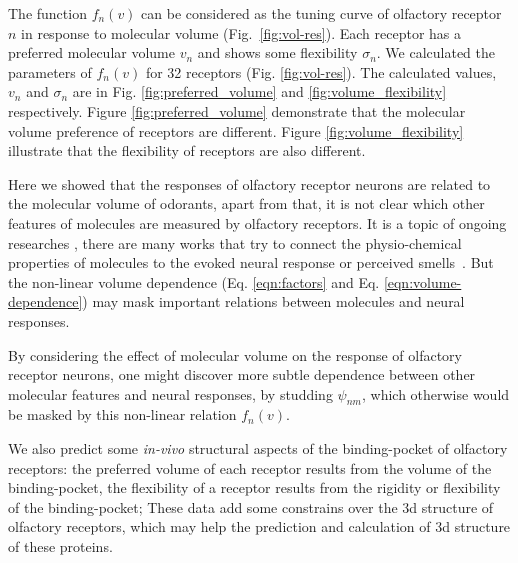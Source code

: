 \documentclass[11pt]{paper} %
\newcommand{\numberofreceptors}{32 }
\begin{document}

The function $f_n(v)$ can be considered as the tuning curve of olfactory receptor $n$ in response to molecular volume (Fig.~\ref{fig:vol-res}). 
Each receptor has a preferred molecular volume $v_n$ and shows some flexibility $\sigma_n$. 
We calculated the parameters of $f_n(v)$ for \numberofreceptors receptors (Fig. \ref{fig:vol-res}). 
The calculated values, $v_n$ and $\sigma_n$ are in Fig. \ref{fig:preferred_volume} and \ref{fig:volume_flexibility} respectively.
Figure \ref{fig:preferred_volume} demonstrate that the molecular volume preference of receptors are different. 
Figure \ref{fig:volume_flexibility} illustrate that the flexibility of receptors are also different.

Here we showed that the responses of olfactory receptor neurons are related to the molecular volume of odorants, 
apart from that, it is not clear which other features of molecules are measured by olfactory receptors. 
It is a topic of ongoing researches , 
there are many works that try to connect the physio-chemical properties of molecules to the evoked neural response or perceived smells~\cite{Gabler2013,Schmuker2007}.
But the non-linear volume dependence (Eq. \ref{eqn:factors} and Eq. \ref{eqn:volume-dependence})  
may mask important relations between molecules and neural responses.

By considering the effect of molecular volume on the response of olfactory receptor neurons, 
one might discover more subtle dependence between other molecular features and neural responses, by studding $\psi_{nm}$, 
which otherwise would be masked by this non-linear relation $f_n(v)$.

We also predict some {\it in-vivo} structural aspects of  the binding-pocket of olfactory receptors:
the preferred volume of each receptor results from the volume of the binding-pocket,
the flexibility of a receptor results from the rigidity or flexibility of the binding-pocket; 
These data add some constrains over the 3d structure of olfactory receptors, 
which may help the prediction and calculation of 3d structure of these proteins. 
\end{document}
